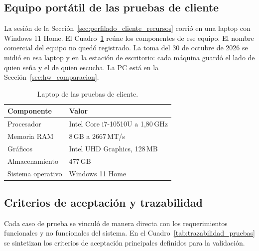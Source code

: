 \subsection{Equipo portátil de las pruebas de cliente}
\label{sec:laptop_prueba}
La sesión de la Sección~\ref{sec:perfilado_cliente_recursos} corrió en una laptop con Windows 11 Home. El Cuadro~\ref{tab:laptop_prueba} reúne los componentes de ese equipo. El nombre comercial del equipo no quedó registrado. La toma del 30 de octubre de 2026 se midió en esa laptop y en la estación de escritorio: cada máquina guardó el lado de quien seña y el de quien escucha. La PC está en la Sección~\ref{sec:hw_comparacion}.

\begin{table}[H]
    \centering
    \small
    \caption{Laptop de las pruebas de cliente.}
    \label{tab:laptop_prueba}
    \begin{tabular}{@{}ll@{}}
        \toprule
        \textbf{Componente} & \textbf{Valor} \\
        \midrule
        Procesador & Intel Core i7-10510U a 1{,}80\,GHz \\
        Memoria RAM & 8\,GB a 2667\,MT/s \\
        Gráficos & Intel UHD Graphics, 128\,MB \\
        Almacenamiento & 477\,GB \\
        Sistema operativo & Windows 11 Home \\
        \bottomrule
    \end{tabular}
\end{table}

\subsection{Criterios de aceptación y trazabilidad}
Cada caso de prueba se vinculó de manera directa con los requerimientos funcionales y no funcionales del sistema. En el Cuadro~\ref{tab:trazabilidad_pruebas} se sintetizan los criterios de aceptación principales definidos para la validación.


